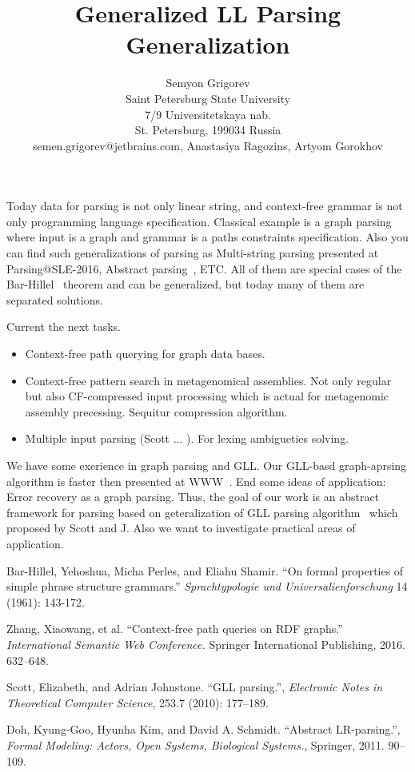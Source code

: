 \documentclass[12pt]{article}  %
\title{Generalized LL Parsing Generalization}
\author{Semyon Grigorev
\\
       {Saint Petersburg State University}\\
       {7/9 Universitetskaya nab.}\\
       {St. Petersburg, 199034 Russia}\\
       {semen.grigorev@jetbrains.com}, 
       Anastasiya Ragozins, Artyom Gorokhov}
\date{}
\theoremstyle{definition}
\theoremstyle{remark}
\begin{document}
\maketitle

Today data for parsing is not only linear string, and context-free grammar is not only programming language specification.
Classical example is a graph parsing where input is a graph and grammar is a paths constraints specification.
Also you can find such generalizations of parsing as Multi-string parsing presented at Parsing@SLE-2016, Abstract parsing~\cite{AbstractParsing}, ETC.
All of them are special cases of the Bar-Hillel~\cite{Bar-Hillel} theorem and can be generalized, but today many of them are separated solutions.

 Current the next tasks.
\begin{itemize}
\item Context-free path querying for graph data bases. 
\item Context-free pattern search in metagenomical assemblies. Not only regular but also CF-compressed input processing which is actual for metagenomic assembly precessing. 
Sequitur compression algorithm.
\item Multiple input parsing (Scott ... ). For lexing ambigueties solving.
\end{itemize}

We have some exerience in graph parsing and GLL. Our GLL-basd graph-aprsing algorithm is faster 
then presented at WWW~\cite{CFRDFParsing}.  End some ideas of application: Error recovery as a 
graph parsing. 
Thus, the goal of our work is an abstract framework for parsing based on geteralization of GLL parsing 
algorithm~\cite{GLL} which proposed by Scott and J.  Also we want to investigate practical areas of 
application.

\begin{thebibliography}{9}

  Bar-Hillel, Yehoshua, Micha Perles, and Eliahu Shamir.
  ``On formal properties of simple phrase structure grammars.''
   \emph{Sprachtypologie und Universalienforschung}
   14 (1961): 143-172.

  Zhang, Xiaowang, et al.
  ``Context-free path queries on RDF graphs.'' 
  \emph{International Semantic Web Conference.}
   Springer International Publishing, 2016.
   632--648.

  Scott, Elizabeth, and Adrian Johnstone.   
  ``GLL parsing.'',
  \emph{Electronic Notes in Theoretical Computer Science},
  253.7 (2010): 177--189.

  Doh, Kyung-Goo, Hyunha Kim, and David A. Schmidt.
  ``Abstract LR-parsing.'',
  \emph{Formal Modeling: Actors, Open Systems, Biological Systems.},
  Springer,
  2011.
  90--109.



\end{thebibliography}
\end{document}
